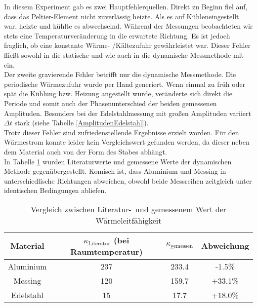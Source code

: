 In diesem Experiment gab es zwei Hauptfehlerquellen. Direkt zu Beginn fiel auf, dass das Peltier-Element nicht zuverlässig heizte. Als es auf \glqq Kühlen\grqq ein\-ge\-stel\-lt war, heizte und kühlte es abwechselnd. Während der Messungen beobachteten wir stets eine Temperaturveränderung in die erwartete Richtung. Es ist jedoch fraglich, ob eine konstante Wärme- /Kältezufuhr gewährleistet war. Dieser Fehler fließt sowohl in die statische und wie auch in die dynamische Messmethode mit ein. \\
Der zweite gravierende Fehler betrifft nur die dynamische Messmethode. Die periodische Wärmezufuhr wurde per Hand generiert. Wenn einmal zu früh oder spät die Kühlung bzw. Heizung angestellt wurde, veränderte sich direkt die Periode und somit auch der Phasenunterschied der beiden gemessenen Amplituden. Besonders bei der Edelstahlmessung mit großen Amplituden variiert $\Delta t$ stark (siehe Tabelle \ref{AmplitudenEdelstahl}). \\
Trotz dieser Fehler sind zufriedenstellende Ergebnisse erzielt worden. 
Für den Wärmestrom konnte leider kein Vergleichswert gefunden werden, da dieser neben dem Material auch von der Form des Stabes abhängt. \\ 
In Tabelle \ref{Literaturwert} wurden Literaturwerte und gemessene Werte der dynamischen Methode gegenübergestellt. Komisch ist, dass Aluminium und Messing in unterschiedlische Richtungen abweichen, obwohl beide Messreihen zeitgleich unter identischen Bedingungen abliefen.


\begin{table}[h!]
\begin{center}
\begin{tabular}{c|c|c|c}
	Material & $\kappa_\text{Literatur}$ (bei Raumtemperatur) & $\kappa_\text{gemessen}$  & Abweichung \\
\hline
	Aluminium & 237 & 233.4 & -1.5\% \\
	Messing & 120 & 159.7 & +33.1\% \\
	Edelstahl & 15 & 17.7 & +18.0\%\\
\end{tabular}
\end{center}
\caption[Vergleich zwischen Literatur- und gemessenem Wert der Wärmeleitfähigkeit]{Vergleich zwischen Literatur-\footnotemark\ und gemessenem Wert der Wärmeleitfähigkeit}
\label{Literaturwert}
\end{table}
